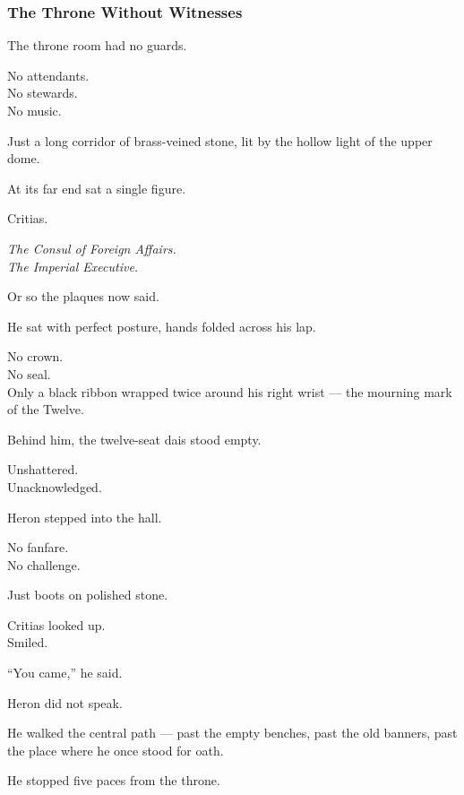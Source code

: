 \documentclass[12pt]{article}
\begin{document}
\dotfill

\subsubsection*{The Throne Without Witnesses}

The throne room had no guards.

No attendants.\\
No stewards.\\
No music.

Just a long corridor of brass-veined stone, lit by the hollow light of the upper dome.

At its far end sat a single figure.

Critias.

\textit{The Consul of Foreign Affairs.}\\
\textit{The Imperial Executive.}

Or so the plaques now said.

\vspace{1em}

He sat with perfect posture, hands folded across his lap.

No crown.\\
No seal.\\
Only a black ribbon wrapped twice around his right wrist — the mourning mark of the Twelve.

Behind him, the twelve-seat dais stood empty.

Unshattered.\\
Unacknowledged.

\vspace{1em}

Heron stepped into the hall.

No fanfare.\\
No challenge.

Just boots on polished stone.

Critias looked up.\\
Smiled.

“You came,” he said.

\vspace{1em}

Heron did not speak.

He walked the central path — past the empty benches, past the old banners, past the place where he once stood for oath.

He stopped five paces from the throne.

\vspace{1em}
\end{document}
